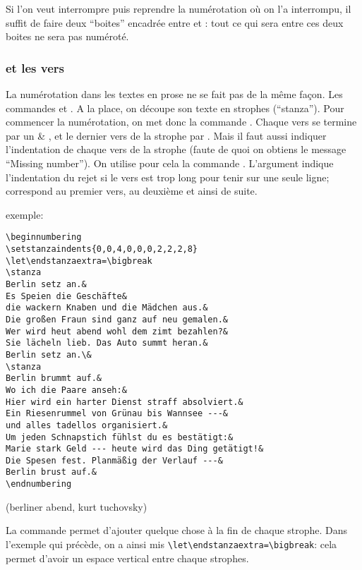 
Si l'on veut interrompre puis reprendre la numérotation où on l'a interrompu, il suffit de faire deux \enquote{boites} encadrée entre  et :  tout ce qui sera entre ces deux boites ne sera pas numéroté.

\subsubsection{ et les vers}

La  numérotation dans les textes en prose ne se fait pas de la même façon. Les commandes  et . A la place, on découpe son texte en strophes (\enquote{stanza}). Pour commencer la numérotation, on met donc la commande . Chaque vers se termine par un & , et le dernier vers de la strophe par \cs{&}.  Mais il faut aussi indiquer l'indentation de chaque vers de la strophe (faute de quoi on obtiens le message \enquote{Missing number}). On utilise pour cela la commande . L'argument  indique l'indentation du rejet si le vers est trop long pour tenir sur une seule ligne;  correspond au premier vers,  au deuxième et ainsi de suite.


exemple: 

\begin{verbatim}
\beginnumbering
\setstanzaindents{0,0,4,0,0,0,2,2,2,8}
\let\endstanzaextra=\bigbreak
\stanza
Berlin setz an.&
Es Speien die Geschäfte&
die wackern Knaben und die Mädchen aus.&
Die großen Fraun sind ganz auf neu gemalen.&
Wer wird heut abend wohl dem zimt bezahlen?&
Sie lächeln lieb. Das Auto summt heran.&
Berlin setz an.\&
\stanza
Berlin brummt auf.&
Wo ich die Paare anseh:&
Hier wird ein harter Dienst straff absolviert.&
Ein Riesenrummel von Grünau bis Wannsee ---&
und alles tadellos organisiert.&
Um jeden Schnapstich fühlst du es bestätigt:&
Marie stark Geld --- heute wird das Ding getätigt!&
Die Spesen fest. Planmäßig der Verlauf ---&
Berlin brust auf.&
\endnumbering
\end{verbatim}

(berliner abend, kurt tuchovsky)

La commande
\cs{\endstanzaextra} permet d'ajouter quelque chose à la fin de chaque strophe.
Dans l'exemple qui précède, on a ainsi mis 
\verb|\let\endstanzaextra=\bigbreak|: cela permet d'avoir 
 un espace vertical entre chaque  strophes.
 
